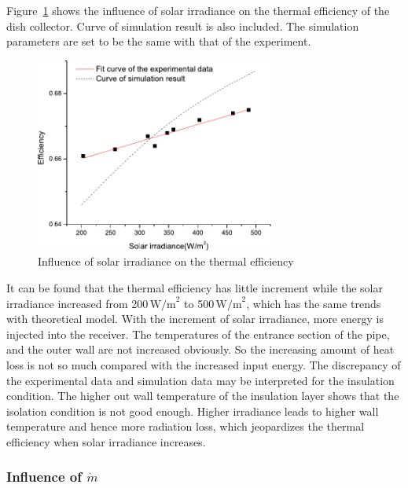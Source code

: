 Figure~\ref{fig:I_r-eta} shows the influence of solar irradiance on the thermal efficiency of the dish collector. Curve of simulation result is also included. The simulation parameters are set to be the same with that of the experiment. 
\begin{figure}[!ht]
\centering
\includegraphics[width=0.7\textwidth]{fig/I_r-eta}
\caption{Influence of solar irradiance on the thermal efficiency}
\label{fig:I_r-eta}
\end{figure}

It can be found that the thermal efficiency has little increment while the solar irradiance increased from 200$\,\mathrm{W/m}^2$ to 500$\,\mathrm{W/m}^2$, which has the same trends with theoretical model. With the increment of solar irradiance, more energy is injected into the receiver. The temperatures of the entrance section of the pipe, and the outer wall are not increased obviously. So the increasing amount of heat loss is not so much compared with the increased input energy. 
The discrepancy of the experimental data and simulation data may be interpreted for the insulation condition. The higher out wall temperature of the insulation layer shows that the isolation condition is not good enough. Higher irradiance leads to higher wall temperature and hence more radiation loss, which jeopardizes the thermal efficiency when solar irradiance increases.


\subsubsection{Influence of $\dot{m}$}


